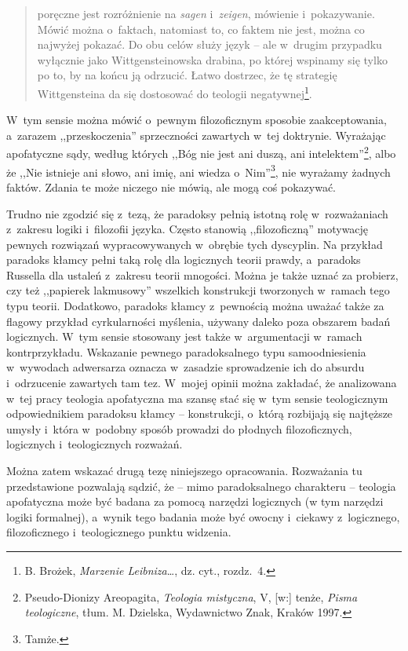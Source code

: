 \begin{quote}
poręczne jest rozróżnienie na \textit{sagen} i~\textit{zeigen}, mówienie i~pokazywanie. Mówić można o~faktach, natomiast to, co faktem nie jest, można co najwyżej pokazać. Do obu celów służy język -- ale w~drugim przypadku wyłącznie jako Wittgensteinowska drabina, po której wspinamy się tylko po to, by na końcu ją odrzucić. Łatwo dostrzec, że tę strategię Wittgensteina da się dostosować do teologii negatywnej\footnote{B. Brożek, \textit{Marzenie Leibniza}…, dz. cyt., rozdz.~4.}.
\end{quote}

W~tym sensie można mówić o~pewnym filozoficznym sposobie zaakceptowania, a~zarazem ,,przeskoczenia'' sprzeczności zawartych w~tej doktrynie. Wyrażając apofatyczne sądy, według których ,,Bóg nie jest ani duszą, ani intelektem''\footnote{Pseudo-Dionizy Areopagita, \textit{Teologia mistyczna}, V, [w:] tenże, \textit{Pisma teologiczne}, tłum. M. Dzielska, Wydawnictwo Znak, Kraków 1997.}, albo że ,,Nie istnieje ani słowo, ani imię, ani wiedza o~Nim''\footnote{Tamże.}, nie wyrażamy żadnych faktów. Zdania te może niczego nie mówią, ale mogą coś pokazywać.

Trudno nie zgodzić się z~tezą, że paradoksy pełnią istotną rolę w~rozważaniach z~zakresu logiki i~filozofii języka. Często stanowią ,,filozoficzną'' motywację pewnych rozwiązań wypracowywanych w~obrębie tych dyscyplin. Na przykład paradoks kłamcy pełni taką rolę dla logicznych teorii prawdy, a~paradoks Russella dla ustaleń z~zakresu teorii mnogości. Można je także uznać za probierz, czy też ,,papierek lakmusowy'' wszelkich konstrukcji tworzonych w~ramach tego typu teorii. Dodatkowo, paradoks kłamcy z~pewnością można uważać także za flagowy przykład cyrkularności myślenia, używany daleko poza obszarem badań logicznych. W~tym sensie stosowany jest także w~argumentacji w~ramach kontrprzykładu. Wskazanie pewnego paradoksalnego typu samoodniesienia w~wywodach adwersarza oznacza w~zasadzie sprowadzenie ich do absurdu i~odrzucenie zawartych tam tez. W~mojej opinii można zakładać, że analizowana w~tej pracy teologia apofatyczna ma szansę stać się w~tym sensie teologicznym odpowiednikiem paradoksu kłamcy -- konstrukcji, o~którą rozbijają się najtęższe umysły i~która w~podobny sposób prowadzi do płodnych filozoficznych, logicznych i~teologicznych rozważań.

Można zatem wskazać drugą tezę niniejszego opracowania. Rozważania tu przedstawione pozwalają sądzić, że -- mimo paradoksalnego charakteru -- teologia apofatyczna może być badana za pomocą narzędzi logicznych (w tym narzędzi logiki formalnej), a~wynik tego badania może być owocny i~ciekawy z~logicznego, filozoficznego i~teologicznego punktu widzenia.

